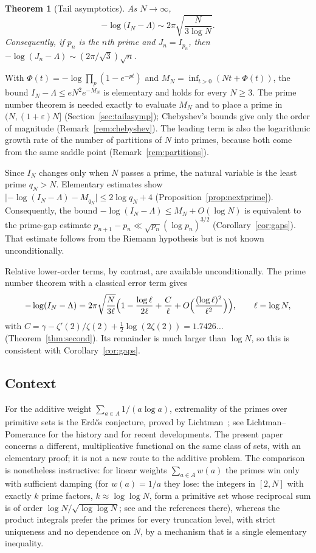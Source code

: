 \documentclass[11pt]{article}
\newtheorem{theorem}{Theorem}[section]
\theoremstyle{remark}
\begin{document}
\begin{theorem}[Tail asymptotics]\label{thm:tail}
As $N\to\infty$,
\[
  -\log\bigl(I_N-\Lambda\bigr)\sim2\pi\sqrt{\frac{N}{3\log N}} .
\]
Consequently, if $p_n$ is the $n$th prime and $J_n=I_{p_n}$, then
$-\log(J_n-\Lambda)\sim(2\pi/\sqrt3)\sqrt n$.
\end{theorem}

With $\Phi(t)=-\log\prod_p(1-e^{-pt})$ and
$M_N=\inf_{t>0}(Nt+\Phi(t))$, the bound $I_N-\Lambda\le eN^2e^{-M_N}$ is
elementary and holds for every $N\ge3$. The prime number theorem is
needed exactly to evaluate $M_N$ and to place a prime in
$(N,(1+\varepsilon)N]$ (Section~\ref{sec:tailasymp}); Chebyshev's bounds give only the order of
magnitude (Remark~\ref{rem:chebyshev}). The leading term is also the
logarithmic growth rate of the number of partitions of $N$ into primes,
because both come from the same saddle point
(Remark~\ref{rem:partitions}).

Since $I_N$ changes only when $N$ passes a prime, the natural
variable is the least prime $q_N>N$. Elementary estimates show
$\bigl|{-\log(I_N-\Lambda)}-M_{q_N}\bigr|\le2\log q_N+4$
(Proposition~\ref{prop:nextprime}). Consequently, the bound
$-\log(I_N-\Lambda)\le M_N+O(\log N)$ is equivalent to the prime-gap
estimate $p_{n+1}-p_n\ll\sqrt{p_n}(\log p_n)^{3/2}$
(Corollary~\ref{cor:gaps}). That estimate follows from the Riemann
hypothesis but is not known unconditionally.

Relative lower-order terms, by contrast, are available unconditionally.
The prime number theorem with a classical error term gives
\[
  -\log(I_N-\Lambda)=2\pi\sqrt{\frac{N}{3\ell}}
  \Bigl(1-\frac{\log\ell}{2\ell}+\frac{C}{\ell}
  +O\Bigl(\frac{(\log\ell)^2}{\ell^2}\Bigr)\Bigr),\qquad \ell=\log N,
\]
with $C=\gamma-\zeta'(2)/\zeta(2)+\tfrac12\log(2\zeta(2))=1.7426\ldots$
(Theorem~\ref{thm:second}). Its remainder is much larger than $\log N$,
so this is consistent with Corollary~\ref{cor:gaps}.

\subsection{Context}
For the additive weight $\sum_{a\in A}1/(a\log a)$, extremality of the
primes over primitive sets is the Erd\H{o}s conjecture, proved by
Lichtman~\cite{Lichtman2023}; see Lichtman--Pomerance
\cite{LichtmanPomerance2019} for the history and \cite{Alexeev2026} for
recent developments. The present paper concerns a different, multiplicative
functional on the same class of sets, with an elementary proof; it is
not a new route to the additive problem. The comparison is
nonetheless instructive: for linear weights $\sum_{a\in A}w(a)$ the
primes win only with sufficient damping (for $w(a)=1/a$ they lose: the
integers in $[2,N]$ with exactly $k$ prime factors, $k\approx\log\log N$,
form a primitive set whose reciprocal sum is of order
$\log N/\sqrt{\log\log N}$; see \cite{LichtmanPomerance2019} and the
references there), whereas the product integrals prefer the
primes for every truncation level, with strict uniqueness and no
dependence on $N$, by a mechanism that is a single elementary
inequality.
\end{document}
